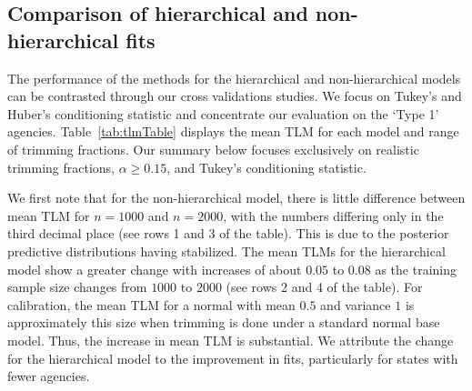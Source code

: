 \documentclass[11pt]{article}
\begin{document}
%



\subsection{Comparison of hierarchical and non-hierarchical fits}

The performance of the methods for the hierarchical and non-hierarchical models can be contrasted through our cross validations studies.  We focus on Tukey's and Huber's conditioning statistic and concentrate our evaluation on the `Type 1' agencies. Table~\ref{tab:tlmTable} displays the mean TLM for each model and range of trimming fractions.  Our summary below focuses exclusively on realistic trimming fractions, $\alpha \geq 0.15$, and Tukey's conditioning statistic.  

We first note that for the non-hierarchical model, there is little difference between mean TLM for $n=1000$ and $n=2000$, with 
the numbers differing only in the third decimal place (see rows 1 and 3 of the table).  This is due to the posterior predictive distributions having stabilized.  The
mean TLMs for the hierarchical model show a greater change with increases of about $0.05$ to $0.08$ as the training sample size changes
from $1000$ to $2000$ (see rows 2 and 4 of the table).  For calibration, the mean TLM for a normal with mean $0.5$ and variance $1$ is approximately this size
when trimming is done under a standard normal base model.  Thus, the increase in mean TLM is substantial.  
We attribute the change for the hierarchical model to the 
improvement in fits, particularly for states with fewer agencies.  
\end{document}
